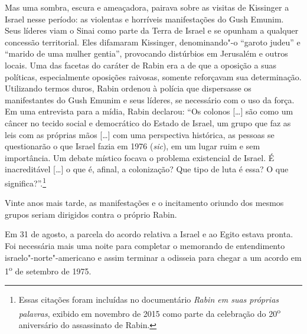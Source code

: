 Mas uma sombra, escura e ameaçadora, pairava sobre as visitas de
Kissinger a Israel nesse período: as violentas e horríveis manifestações
do Gush Emunim. Seus líderes viam o Sinai como parte da Terra de Israel
e se opunham a qualquer concessão territorial. Eles difamaram Kissinger,
denominando"-o ``garoto judeu'' e ``marido de uma mulher gentia'',
provocando distúrbios em Jerusalém e outros locais. Uma das facetas do
caráter de Rabin era a de que a oposição a suas políticas, especialmente
oposições raivosas, somente reforçavam sua determinação. Utilizando
termos duros, Rabin ordenou à polícia que dispersasse os manifestantes
do Gush Emunim e seus líderes, se necessário com o uso da força. Em uma
entrevista para a mídia, Rabin declarou: ``Os colonos {[}\ldots{}{]} são como um
câncer no tecido social e democrático do Estado de Israel, um grupo que
faz as leis com as próprias mãos {[}\ldots{}{]} com uma perspectiva histórica, as
pessoas se questionarão o que Israel fazia em 1976 (\emph{sic}), em um
lugar ruim e sem importância. Um debate místico focava o problema
existencial de Israel. É inacreditável {[}\ldots{}{]} o que é, afinal, a
colonização? Que tipo de luta é essa? O que significa?''.\footnote{Essas citações foram incluídas no documentário \emph{Rabin em suas próprias palavras},
exibido em novembro de 2015 como parte da celebração do
20\textsuperscript{o} aniversário do assassinato de Rabin.}

Vinte anos mais tarde, as manifestações e o incitamento oriundo dos
mesmos grupos seriam dirigidos contra o próprio Rabin.

Em 31 de agosto, a parcela do acordo relativa a Israel e ao Egito estava
pronta. Foi necessária mais uma noite para completar o memorando de
entendimento israelo"-norte"-americano e assim terminar a odisseia para
chegar a um acordo em 1\textsuperscript{o} de setembro de 1975.

